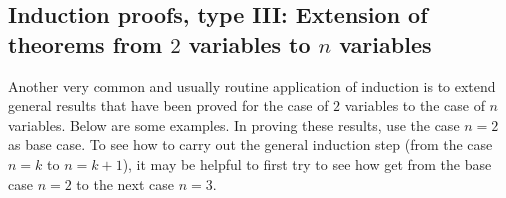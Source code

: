 %
%
%
%


\subsection*{Induction proofs, type III:
Extension of theorems from $2$ variables to $n$ variables}
Another very common and usually routine application of induction is to
extend general results that have been proved for the case of $2$
variables to the case of $n$ variables.  Below are some examples.
In proving these results, use the case $n=2$ as base case. To see how to
carry out the general induction step (from the case $n=k$ to
$n=k+1$), it may be  helpful to first try to see how get from the base
case $n=2$ to the next case $n=3$.
\medskip

